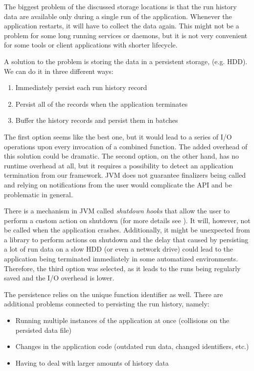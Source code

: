 The biggest problem of the discussed storage locations is that the run history data are available only during a single run of the application. Whenever the application restarts, it will have to collect the data again. This might not be a problem for some long running services or daemons, but it is not very convenient for some tools or client applications with shorter lifecycle.

A solution to the problem is storing the data in a persistent storage, (e.g. HDD). We can do it in three different ways:

\begin{enumerate}
	\item Immediately persist each run history record
	\item Persist all of the records when the application terminates
	\item Buffer the history records and persist them in batches
\end{enumerate}

The first option seems like the best one, but it would lead to a series of I/O operations upon every invocation of a combined function. The added overhead of this solution could be dramatic. The second option, on the other hand, has no runtime overhead at all, but it requires a possibility to detect an application termination from our framework. JVM does not guarantee finalizers being called and relying on notifications from the user would complicate the API and be problematic in general. 

There is a mechanism in JVM called \textit{shutdown hooks} that allow the user to perform a custom action on shutdown (for more details see \cite{noauthor_jvmshuthooks_nodate}). It will, however, not be called when the application crashes. Additionally, it might be unexpected from a library to perform actions on shutdown and the delay that caused by persisting a lot of run data on a slow HDD (or even a network drive) could lead to the application being terminated immediately in some automatized environments.
Therefore, the third option was selected, as it leads to the runs being regularly saved and the I/O overhead is lower.

The persistence relies on the unique function identifier as well. There are additional problems connected to persisting the run history, namely:
\begin{itemize}
	\item Running multiple instances of the application at once (collisions on the persisted data file)
	\item Changes in the application code (outdated run data, changed identifiers, etc.)
	\item Having to deal with larger amounts of history data
\end{itemize}

